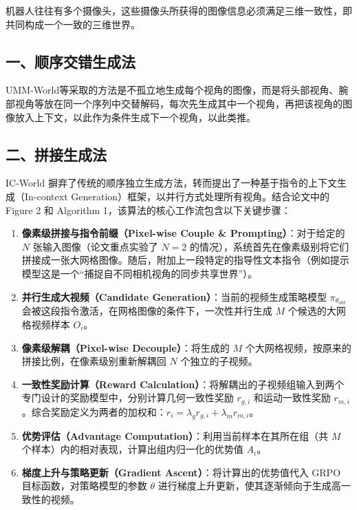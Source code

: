 机器人往往有多个摄像头，这些摄像头所获得的图像信息必须满足三维一致性，即共同构成一个一致的三维世界。

\hypertarget{ux4e00ux987aux5e8fux4ea4ux9519ux751fux6210ux6cd5}{%
\subsection{一、顺序交错生成法}\label{ux4e00ux987aux5e8fux4ea4ux9519ux751fux6210ux6cd5}}

UMM-World等采取的方法是不孤立地生成每个视角的图像，而是将头部视角、腕部视角等放在同一个序列中交替解码，每次先生成其中一个视角，再把该视角的图像放入上下文，以此作为条件生成下一个视角，以此类推。

\hypertarget{ux4e8cux62fcux63a5ux751fux6210ux6cd5}{%
\subsection{二、拼接生成法}\label{ux4e8cux62fcux63a5ux751fux6210ux6cd5}}

IC-World 摒弃了传统的顺序独立生成方法，转而提出了一种基于指令的上下文生成（In-context Generation）框架，以并行方式处理所有视角。结合论文中的 Figure 2 和 Algorithm 1，该算法的核心工作流包含以下关键步骤：

\begin{enumerate}
\def\labelenumi{\arabic{enumi}.}
\tightlist
\item
  \textbf{像素级拼接与指令前缀（Pixel-wise Couple \& Prompting）}：对于给定的 \(N\) 张输入图像（论文重点实验了 \(N=2\) 的情况），系统首先在像素级别将它们拼接成一张大网格图像。随后，附加上一段特定的指导性文本指令（例如提示模型这是一个``捕捉自不同相机视角的同步共享世界''）。
\item
  \textbf{并行生成大视频（Candidate Generation）}：当前的视频生成策略模型 \(\pi_{\theta_{old}}\) 会被这段指令激活，在网格图像的条件下，一次性并行生成 \(M\) 个候选的大网格视频样本 \(O_i\)。
\item
  \textbf{像素级解耦（Pixel-wise Decouple）}：将生成的 \(M\) 个大网格视频，按原来的拼接比例，在像素级别重新解耦回 \(N\) 个独立的子视频。
\item
  \textbf{一致性奖励计算（Reward Calculation）}：将解耦出的子视频组输入到两个专门设计的奖励模型中，分别计算几何一致性奖励 \(r_{g,i}\) 和运动一致性奖励 \(r_{m,i}\)。综合奖励定义为两者的加权和：\(r_i=\lambda_g r_{g,i}+\lambda_m r_{m,i}\)。
\item
  \textbf{优势评估（Advantage Computation）}：利用当前样本在其所在组（共 \(M\) 个样本）内的相对表现，计算出组内归一化的优势值 \(A_i\)。
\item
  \textbf{梯度上升与策略更新（Gradient Ascent）}：将计算出的优势值代入 GRPO 目标函数，对策略模型的参数 \(\theta\) 进行梯度上升更新，使其逐渐倾向于生成高一致性的视频。
\end{enumerate}

